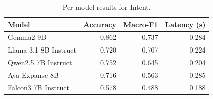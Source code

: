 \begin{table}[t]
\centering
\caption{Per-model results for Intent.}
\label{tab:appendix-intent-classification-analysis}
\begin{tabular}{lrrr}
\toprule
Model & Accuracy & Macro-F1 & Latency (s) \\
\midrule
Gemma2 9B & 0.862 & 0.737 & 0.284 \\
Llama 3.1 8B Instruct & 0.720 & 0.707 & 0.224 \\
Qwen2.5 7B Instruct & 0.752 & 0.645 & 0.204 \\
Aya Expanse 8B & 0.716 & 0.563 & 0.285 \\
Falcon3 7B Instruct & 0.578 & 0.488 & 0.188 \\
\bottomrule
\end{tabular}
\end{table}
